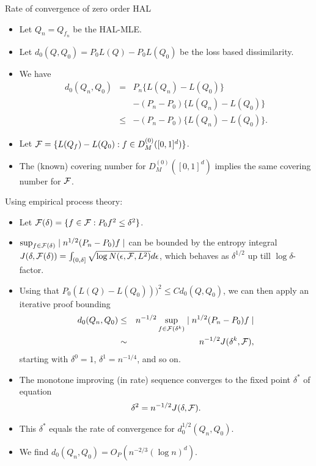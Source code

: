 \documentclass[t]{beamer}
\newlength{\wideitemsep}
\let\olditem\item
\renewcommand{\item}{\setlength{\itemsep}{\wideitemsep}\olditem}
\begin{document}
\begin{frame}{Rate of convergence of zero order HAL}
\begin{itemize}
\item Let $Q_n=Q_{f_n}$ be the HAL-MLE.
\item Let $d_0(Q,Q_0)=P_0L(Q)-P_0L(Q_0)$ be the loss based dissimilarity.
\item We  have
\begin{eqnarray*}
d_0(Q_n,Q_0)&=&P_n\{ L(Q_n)-L(Q_0)\}\\
&&-(P_n-P_0)\{L(Q_n)-L(Q_0)\}\\
&\leq &- (P_n-P_0)\{L(Q_n)-L(Q_0)\}.
\end{eqnarray*}
\item Let ${\cal F}=\{L(Q_f)-L(Q_0):f\in D^{(0)}_M([0,1]^d)\}$.
\item The (known) covering number for $D^{(0)}_M([0,1]^d)$ implies the same covering number for ${\cal F}$.
\end{itemize}
\end{frame}

\begin{frame}{Using empirical process theory:}
\begin{itemize}
\item Let ${\cal F}(\delta)=\{f\in {\cal F}: P_0f^2\leq \delta^2\}$.
\item $\sup_{f\in {\cal F}(\delta)}\mid n^{1/2}(P_n-P_0)f\mid$ can be bounded by  the entropy integral
$J(\delta,{\cal F}(\delta))=\int_{(0,\delta]}\sqrt{\log N(\epsilon,{\cal F},L^2)} d\epsilon$, which behaves as $\delta^{1/2}$ up till $\log \delta$-factor.
\item Using that $P_0(L(Q)-L(Q_0)))^2\leq C d_0(Q,Q_0)$, we can then apply an iterative proof bounding \begin{eqnarray*}
d_0(Q_n,Q_0)&\leq& n^{-1/2}\sup_{f\in {\cal F}(\delta^k)}\mid n^{1/2}(P_n-P_0)f\mid\\
&\sim & n^{-1/2} J(\delta^k,{\cal F}),\end{eqnarray*}
 starting with $\delta^0=1$, $\delta^1=n^{-1/4}$, and so on.
  \end{itemize}
 \end{frame}
 \begin{frame}
 \begin{itemize}
 \item The monotone improving (in rate) sequence converges to the fixed point $\delta^*$ of equation
 \[
 \delta^2=n^{-1/2}J(\delta,{\cal F}).\]
 \item
This $\delta^*$ equals the rate of convergence for $d_0^{1/2}(Q_n,Q_0)$.
\item We find $d_0(Q_n,Q_0)=O_P(n^{-2/3}(\log n)^d)$.
\end{itemize}
\end{frame}
\end{document}
